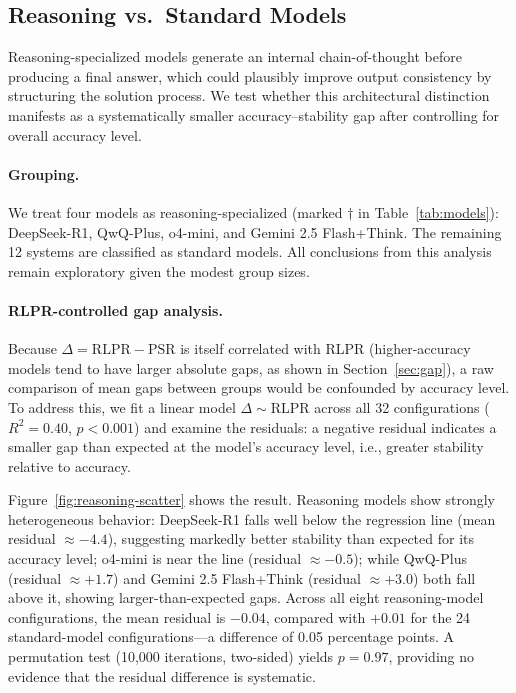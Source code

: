 \documentclass[11pt]{article}
\begin{document}
\subsection{Reasoning vs.\ Standard Models}

Reasoning-specialized models generate an internal chain-of-thought before producing a final answer, which could plausibly improve output consistency by structuring the solution process. We test whether this architectural distinction manifests as a systematically smaller accuracy--stability gap after controlling for overall accuracy level.

\paragraph{Grouping.} We treat four models as reasoning-specialized (marked $\dagger$ in Table~\ref{tab:models}): DeepSeek-R1, QwQ-Plus, o4-mini, and Gemini 2.5 Flash+Think. The remaining 12 systems are classified as standard models. All conclusions from this analysis remain exploratory given the modest group sizes.

\paragraph{RLPR-controlled gap analysis.} Because $\Delta = \mathrm{RLPR} - \mathrm{PSR}$ is itself correlated with RLPR (higher-accuracy models tend to have larger absolute gaps, as shown in Section~\ref{sec:gap}), a raw comparison of mean gaps between groups would be confounded by accuracy level. To address this, we fit a linear model $\Delta \sim \mathrm{RLPR}$ across all 32 configurations ($R^2=0.40$, $p<0.001$) and examine the residuals: a negative residual indicates a smaller gap than expected at the model's accuracy level, i.e., greater stability relative to accuracy.

Figure~\ref{fig:reasoning-scatter} shows the result. Reasoning models show strongly heterogeneous behavior: DeepSeek-R1 falls well below the regression line (mean residual $\approx -4.4$), suggesting markedly better stability than expected for its accuracy level; o4-mini is near the line (residual $\approx -0.5$); while QwQ-Plus (residual $\approx +1.7$) and Gemini 2.5 Flash+Think (residual $\approx +3.0$) both fall above it, showing larger-than-expected gaps. Across all eight reasoning-model configurations, the mean residual is $-0.04$, compared with $+0.01$ for the 24 standard-model configurations---a difference of 0.05 percentage points. A permutation test (10{,}000 iterations, two-sided) yields $p=0.97$, providing no evidence that the residual difference is systematic.
\end{document}
